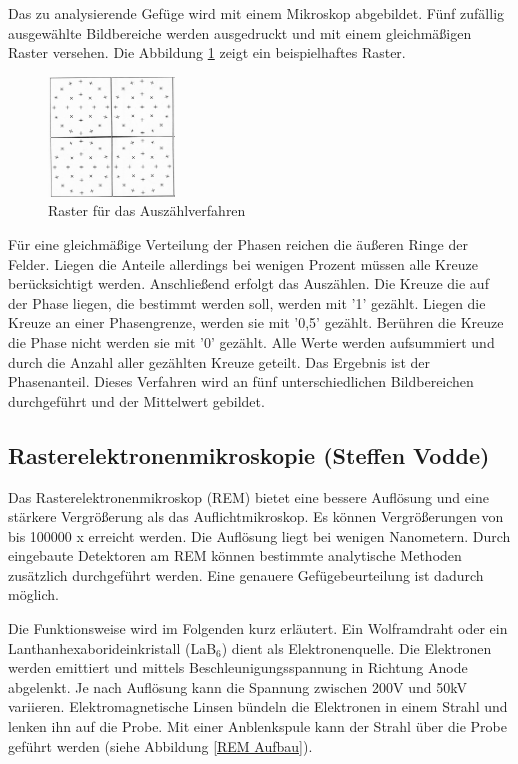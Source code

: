 \documentclass[a4paper, 11pt]{tubsreprt}
\begin{document}
Das zu analysierende Gefüge wird mit einem Mikroskop abgebildet. Fünf zufällig ausgewählte Bildbereiche werden ausgedruckt und mit einem gleichmäßigen Raster versehen. Die Abbildung \ref{Raster für das Auszählverfahren} zeigt ein beispielhaftes Raster.
\begin{figure} %
\centering
\includegraphics[width=0.3\textwidth]{Bilder/Raster.png}
\caption{Raster für das Auszählverfahren}
\label{Raster für das Auszählverfahren}
\end{figure}

Für eine gleichmäßige Verteilung der Phasen reichen die äußeren Ringe der Felder. Liegen die Anteile allerdings bei wenigen Prozent müssen alle Kreuze berücksichtigt werden. 
Anschließend erfolgt das Auszählen. Die Kreuze die auf der Phase liegen, die bestimmt werden soll, werden mit '1' gezählt. Liegen die Kreuze an einer Phasengrenze, werden sie mit '0,5' gezählt. Berühren die Kreuze die Phase nicht werden sie mit '0' gezählt. Alle Werte werden aufsummiert und durch die Anzahl aller gezählten Kreuze geteilt. Das Ergebnis ist der Phasenanteil. Dieses Verfahren wird an fünf unterschiedlichen Bildbereichen durchgeführt und der Mittelwert gebildet.
\newpage

\subsection{Rasterelektronenmikroskopie (Steffen Vodde)}\label{Kapitel Rasterelektrodenmikroskopie}
Das Rasterelektronenmikroskop (REM) bietet eine bessere Auflösung und eine stärkere Vergrößerung als das Auflichtmikroskop. Es können Vergrößerungen von bis 100000 x erreicht werden. Die Auflösung liegt bei wenigen Nanometern. Durch eingebaute Detektoren am REM können bestimmte analytische Methoden zusätzlich durchgeführt werden. Eine genauere Gefügebeurteilung ist dadurch möglich.  

Die Funktionsweise wird im Folgenden kurz erläutert. Ein Wolframdraht oder ein Lanthanhexaborideinkristall (LaB$_{6}$) dient als Elektronenquelle. Die Elektronen werden emittiert und mittels Beschleunigungsspannung in Richtung Anode abgelenkt. Je nach Auflösung kann die Spannung zwischen 200V und 50kV variieren. Elektromagnetische Linsen bündeln die Elektronen in einem Strahl und lenken ihn auf die Probe. Mit einer Anblenkspule kann der Strahl über die Probe geführt werden (siehe Abbildung \ref{REM Aufbau}).  
\end{document}
